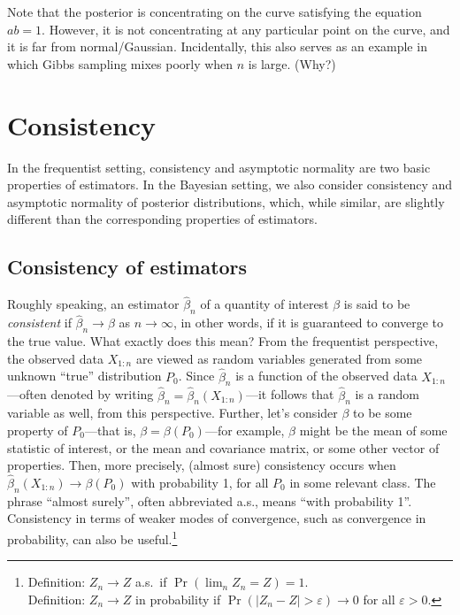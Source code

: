 \documentclass[12pt]{article}
\begin{document}
Note that the posterior is concentrating on the curve satisfying the equation $a b = 1$. However, it is not concentrating at any particular point on the curve, and it is far from normal/Gaussian.
Incidentally, this also serves as an example in which Gibbs sampling mixes poorly when $n$ is large. (Why?)



\section{Consistency}

In the frequentist setting, consistency and asymptotic normality are two basic properties of estimators. In the Bayesian setting, we also consider consistency and asymptotic normality of posterior distributions, which, while similar, are slightly different than the corresponding properties of estimators.

\subsection{Consistency of estimators}

Roughly speaking, an estimator $\hat\beta_n$ of a quantity of interest $\beta$ is said to be \textit{consistent} if $\hat\beta_n \to \beta$ as $n\to\infty$, in other words, if it is guaranteed to converge to the true value. What exactly does this mean? From the frequentist perspective, the observed data $X_{1:n}$ are viewed as random variables generated from some unknown ``true'' distribution $P_0$.  Since $\hat\beta_n$ is a function of the observed data $X_{1:n}$---often denoted by writing $\hat\beta_n = \hat\beta_n(X_{1:n})$---it follows that $\hat\beta_n$ is a random variable as well, from this perspective.  Further, let's consider $\beta$ to be some property of $P_0$---that is, $\beta = \beta(P_0)$---for example, $\beta$ might be the mean of some statistic of interest, or the mean and covariance matrix, or some other vector of properties.  Then, more precisely, (almost sure) consistency occurs when $\hat\beta_n(X_{1:n}) \to \beta(P_0)$ with probability 1, for all $P_0$ in some relevant class. The phrase ``almost surely'', often abbreviated a.s., means ``with probability 1''. Consistency in terms of weaker modes of convergence, such as convergence in probability, can also be useful.\footnote{Definition: $Z_n \to Z$ a.s.\ if $\Pr(\lim_n Z_n = Z) = 1$. \\ Definition: $Z_n \to Z$ in probability if $\Pr(|Z_n - Z| >\varepsilon) \to 0$ for all $\varepsilon >0$.}
\end{document}
